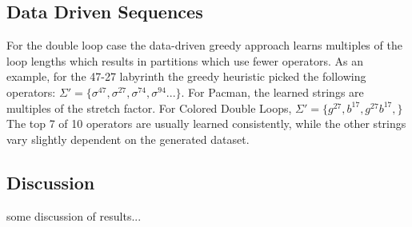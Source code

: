 \subsection{Data Driven Sequences}
For the double loop case the data-driven greedy approach learns multiples of the loop lengths which results in partitions which use fewer operators. As an example, for the 47-27 labyrinth the greedy heuristic picked the following operators: $\Sigma'=\{\sigma^{47}, \sigma^{27}, \sigma^{74}, \sigma^{94} ...\}$. For Pacman, the learned strings are multiples of the stretch factor. For Colored Double Loops, $\Sigma' = \{g^{27},b^{17},g^{27}b^{17},\}$ The top 7 of 10 operators are usually learned consistently, while the other strings vary slightly dependent on the generated dataset.

\subsection{Discussion}

some discussion of results...

